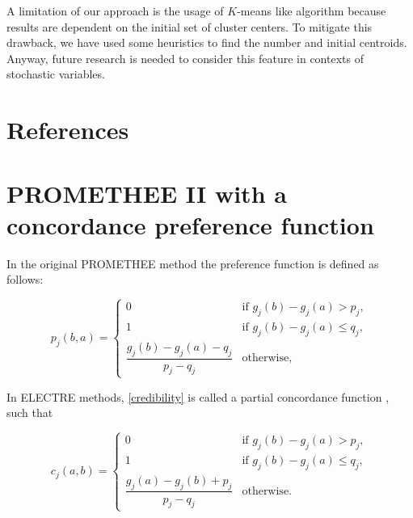 \documentclass[]{elsarticle}
\theoremstyle{definition}
\begin{document}
A limitation of our approach is the usage of $K$-means like algorithm because results are dependent on the initial set of cluster centers.  To mitigate this drawback, we have used some heuristics to find the number and initial centroids. Anyway, future research is needed to  consider this feature in contexts of stochastic variables.
     
     

          
\section*{References}







\appendix
\section{PROMETHEE II with a concordance preference function}\label{concordance}

In the original PROMETHEE method the preference function is defined as follows:

\begin{equation}
p_j(b,a) =
\begin{cases}
	0							& \mbox{if  $g_j(b)-g_j(a) > p_j$}, \\
	1							& \mbox{if  $g_j(b)-g_j(a) \leq q_j$},   \\
	\dfrac{g_j(b)-g_j(a)-q_j}{p_j-q_j} 	& \mbox{otherwise}, 				     	      
 \end{cases} 
 \label{p-credibility}
 \end{equation} 
 
In ELECTRE methods, \eqref{credibility} is called a partial concordance function \citep{figueira2010}, such that
 
\begin{equation}
c_j(a,b) =
\begin{cases}
	0							& \mbox{if  $g_j(b)-g_j(a) > p_j$}, \\
	1							& \mbox{if  $g_j(b)-g_j(a) \leq q_j$},   \\
	\dfrac{g_j(a)-g_j(b)+p_j}{p_j-q_j} 	& \mbox{otherwise}. 				     	      
 \end{cases} 
 \label{credibilityinv}
 \end{equation} 
\end{document}
